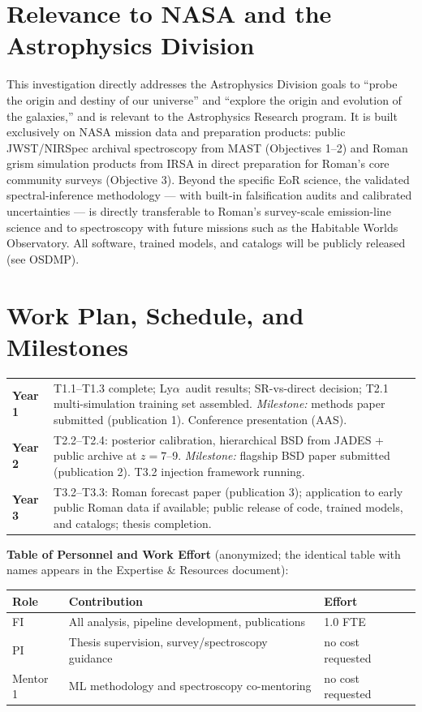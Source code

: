 \documentclass[12pt,letterpaper]{article}
\newcommand{\lya}{Ly$\alpha$}
\begin{document}
\section{Relevance to NASA and the Astrophysics Division}
This investigation directly addresses the Astrophysics Division goals to
``probe the origin and destiny of our universe'' and ``explore the origin
and evolution of the galaxies,'' and is relevant to the Astrophysics
Research program. It is built exclusively on NASA
mission data and preparation products: public JWST/NIRSpec archival
spectroscopy from MAST (Objectives 1--2) and Roman grism simulation
products from IRSA in direct preparation for Roman's core community
surveys (Objective 3). Beyond the specific EoR science, the validated
spectral-inference methodology --- with built-in falsification audits and
calibrated uncertainties --- is directly transferable to Roman's
survey-scale emission-line science and to spectroscopy with future
missions such as the Habitable Worlds Observatory. All software, trained
models, and catalogs will be publicly released (see OSDMP).

\section{Work Plan, Schedule, and Milestones}
\label{sec:schedule}
\begin{center}\small
\begin{tabular}{p{0.65in}p{4.6in}}
\toprule
\textbf{Year 1} & T1.1--T1.3 complete; \lya\ audit results; SR-vs-direct
decision; T2.1 multi-simulation training set assembled. \emph{Milestone:}
methods paper submitted (publication 1). Conference presentation (AAS). \\
\textbf{Year 2} & T2.2--T2.4: posterior calibration, hierarchical BSD from
JADES + public archive at $z=7$--9. \emph{Milestone:} flagship BSD paper
submitted (publication 2). T3.2 injection framework running. \\
\textbf{Year 3} & T3.2--T3.3: Roman forecast paper (publication 3);
application to early public Roman data if available; public release of
code, trained models, and catalogs; thesis completion. \\
\bottomrule
\end{tabular}
\end{center}

\noindent\textbf{Table of Personnel and Work Effort} (anonymized; the
identical table with names appears in the Expertise \& Resources
document):
\begin{center}\small
\begin{tabular}{lll}
\toprule
Role & Contribution & Effort \\
\midrule
FI & All analysis, pipeline development, publications & 1.0 FTE \\
PI & Thesis supervision, survey/spectroscopy guidance & no cost requested \\
Mentor 1 & ML methodology and spectroscopy co-mentoring & no cost requested \\
\bottomrule
\end{tabular}
\end{center}
\end{document}
